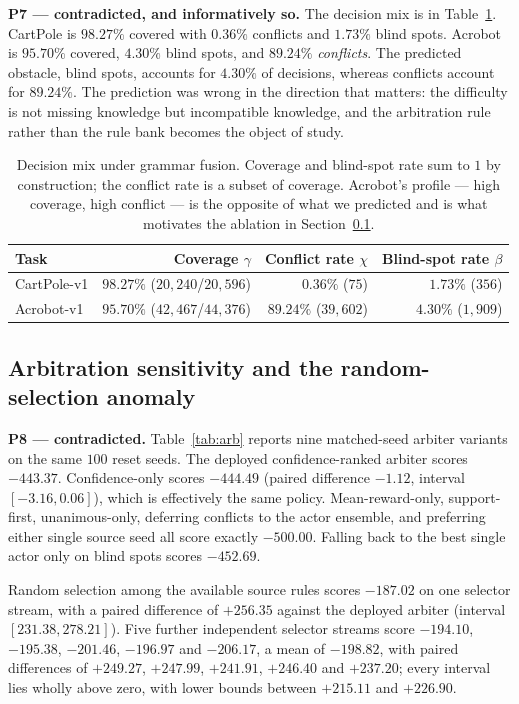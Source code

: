\documentclass[11pt,a4paper]{article}
\begin{document}
\textbf{P7 --- contradicted, and informatively so.} The decision mix is in Table~\ref{tab:mix}. CartPole is $98.27\%$ covered with $0.36\%$ conflicts and $1.73\%$ blind spots. Acrobot is $95.70\%$ covered, $4.30\%$ blind spots, and $89.24\%$ \emph{conflicts}. The predicted obstacle, blind spots, accounts for $4.30\%$ of decisions, whereas conflicts account for $89.24\%$. The prediction was wrong in the direction that matters: the difficulty is not missing knowledge but incompatible knowledge, and the arbitration rule rather than the rule bank becomes the object of study.

\begin{table}[H]
\centering
\caption{Decision mix under grammar fusion. Coverage and blind-spot rate sum to $1$ by construction; the conflict rate is a subset of coverage. Acrobot's profile --- high coverage, high conflict --- is the opposite of what we predicted and is what motivates the ablation in Section~\ref{sec:res-arb}.}
\label{tab:mix}
\small
\begin{tabular}{@{}lrrr@{}}
\toprule
\textbf{Task} & \textbf{Coverage $\gamma$} & \textbf{Conflict rate $\chi$} & \textbf{Blind-spot rate $\beta$} \\
\midrule
CartPole-v1 & $98.27\%$ ($20{,}240$/$20{,}596$) & $0.36\%$ ($75$) & $1.73\%$ ($356$) \\
Acrobot-v1 & $95.70\%$ ($42{,}467$/$44{,}376$) & $89.24\%$ ($39{,}602$) & $4.30\%$ ($1{,}909$) \\
\bottomrule
\end{tabular}
\end{table}

\subsection{Arbitration sensitivity and the random-selection anomaly}
\label{sec:res-arb}

\textbf{P8 --- contradicted.} Table~\ref{tab:arb} reports nine matched-seed arbiter variants on the same $100$ reset seeds. The deployed confidence-ranked arbiter scores $-443.37$. Confidence-only scores $-444.49$ (paired difference $-1.12$, interval $[-3.16, 0.06]$), which is effectively the same policy. Mean-reward-only, support-first, unanimous-only, deferring conflicts to the actor ensemble, and preferring either single source seed all score exactly $-500.00$. Falling back to the best single actor only on blind spots scores $-452.69$.

Random selection among the available source rules scores $-187.02$ on one selector stream, with a paired difference of $+256.35$ against the deployed arbiter (interval $[231.38, 278.21]$). Five further independent selector streams score $-194.10$, $-195.38$, $-201.46$, $-196.97$ and $-206.17$, a mean of $-198.82$, with paired differences of $+249.27$, $+247.99$, $+241.91$, $+246.40$ and $+237.20$; every interval lies wholly above zero, with lower bounds between $+215.11$ and $+226.90$.
\end{document}
